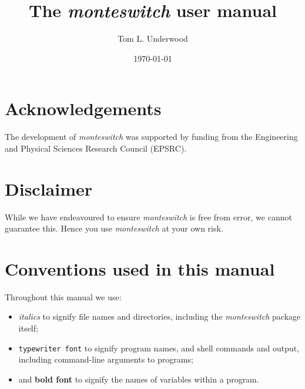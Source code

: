 \documentclass{report}
\begin{document}
\title{The \emph{monteswitch} user manual}
\author{Tom L. Underwood}
\date{\today}
\maketitle


\tableofcontents


\chapter*{Acknowledgements}
The development of \emph{monteswitch} was supported by funding from the Engineering and Physical Sciences Research Council (EPSRC).

\chapter*{Disclaimer}
While we have endeavoured to ensure \emph{monteswitch} is free from error, we cannot guarantee this. Hence you use \emph{monteswitch}
at your own risk.

\renewcommand{\nomname}{List of Abbreviations}
\printnomenclature

\chapter*{Conventions used in this manual}
Throughout this manual we use:
\begin{itemize}
\item \emph{italics} to signify file names and directories, including the \emph{monteswitch} package itself;
\item \texttt{typewriter font} to signify program names, and shell commands and output, including command-line arguments to programs;
\item and \textbf{bold font} to signify the names of variables within a program.
\end{itemize}


\end{document}
